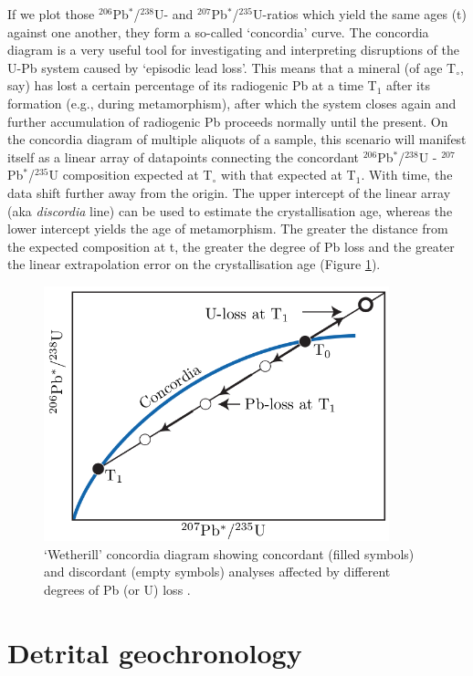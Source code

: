 \documentclass{book}
\newif\ifpdf
\begin{document}
If we plot those $^{206}$Pb$^*$/$^{238}$U- and
$^{207}$Pb$^*$/$^{235}$U-ratios which yield the same ages (t) against
one another, they form a so-called `concordia' curve. The concordia
diagram is a very useful tool for investigating and interpreting
disruptions of the U-Pb system caused by `episodic lead loss'. This
means that a mineral (of age T$_\circ$, say) has lost a certain
percentage of its radiogenic Pb at a time T$_1$ after its formation
(e.g., during metamorphism), after which the system closes again and
further accumulation of radiogenic Pb proceeds normally until the
present.  On the concordia diagram of multiple aliquots of a sample,
this scenario will manifest itself as a linear array of datapoints
connecting the concordant $^{206}$Pb$^*$/$^{238}$U -
$^{207}$Pb$^*$/$^{235}$U composition expected at T$_\circ$ with that
expected at T$_1$.  With time, the data shift further away from the
origin.  The upper intercept of the linear array (aka \emph{discordia}
line) can be used to estimate the crystallisation age, whereas the
lower intercept yields the age of metamorphism.  The greater the
distance from the expected composition at t, the greater the degree of
Pb loss and the greater the linear extrapolation error on the
crystallisation age (Figure \ref{fig:wetherill}).

\begin{figure}[!ht]
  \centering
  \ifpdf
  \def\svgwidth{.7\textwidth}
  
  \else
  \includegraphics[width=10cm]{wetherill.png}
  \fi
  \caption{`Wetherill' concordia diagram showing concordant (filled
    symbols) and discordant (empty symbols) analyses affected by
    different degrees of Pb (or U) loss \citep[modified
      from][]{allegre2008}.}
  \label{fig:wetherill}
\end{figure}

\section{Detrital geochronology}
\end{document}
